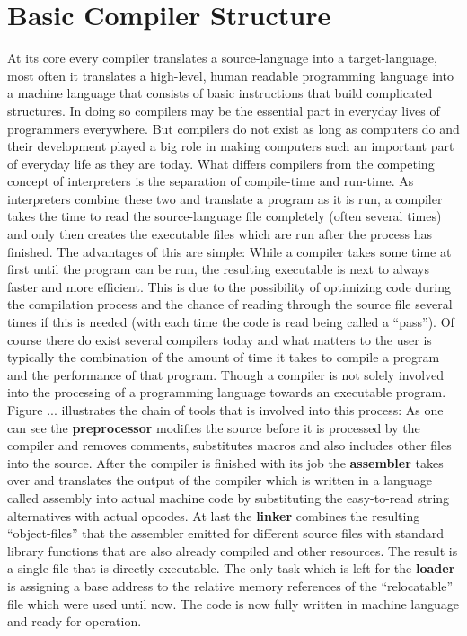 \section{Basic Compiler Structure}
\label{section:compiler}
At its core every compiler translates a source-language into a target-language, most often it translates a high-level, human readable programming language into a machine language that consists of basic instructions that build complicated structures.
In doing so compilers may be the essential part in everyday lives of programmers everywhere.
But compilers do not exist as long as computers do and their development played a big role in making computers such an important part of everyday life as they are today.
What differs compilers from the competing concept of interpreters is the separation of compile-time and run-time.
As interpreters combine these two and translate a program as it is run, a compiler takes the time to read the source-language file completely (often several times) and only then creates the executable files which are run after the process has finished.
The advantages of this are simple:
While a compiler takes some time at first until the program can be run, the resulting executable is next to always faster and more efficient.
This is due to the possibility of optimizing code during the compilation process and the chance of reading through the source file several times if this is needed (with each time the code is read being called a ``pass'').
Of course there do exist several compilers today and what matters to the user is typically the combination of the amount of time it takes to compile a program and the performance of that program.
Though a compiler is not solely involved into the processing of a programming language towards an executable program.
Figure ... illustrates the chain of tools that is involved into this process:
As one can see the \textbf{preprocessor} modifies the source before it is processed by the compiler and removes comments, substitutes macros and also includes other files into the source.
After the compiler is finished with its job the \textbf{assembler} takes over and translates the output of the compiler which is written in a language called assembly into actual machine code by substituting the easy-to-read string alternatives with actual opcodes.
At last the \textbf{linker} combines the resulting ``object-files'' that the assembler emitted for different source files with standard library functions that are also already compiled and other resources. 
The result is a single file that is directly executable.
The only task which is left for the \textbf{loader} is assigning a base address to the relative memory references of the ``relocatable'' file which were used until now.
The code is now fully written in machine language and ready for operation.


